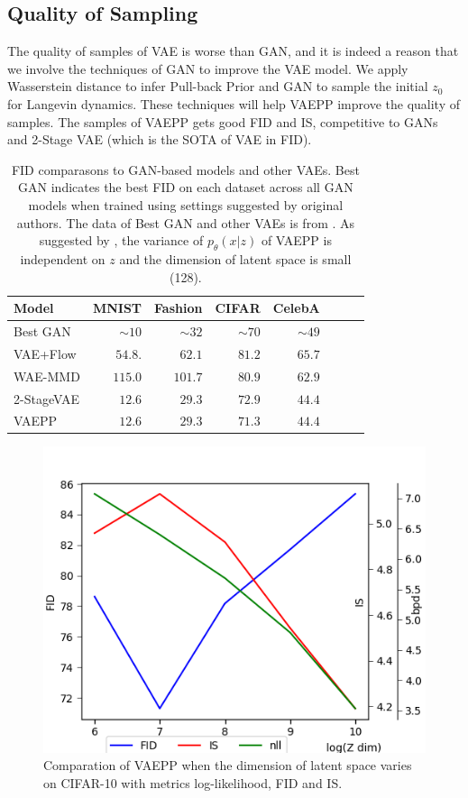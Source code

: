\subsection{Quality of Sampling}
The quality of samples of VAE is worse than GAN, and it is indeed a reason that we involve the techniques of GAN to improve the VAE model. We apply Wasserstein distance to infer Pull-back Prior and GAN to sample the initial $z_0$ for Langevin dynamics. These techniques will help VAEPP improve the quality of samples. The samples of VAEPP gets good FID and IS, competitive to GANs and 2-Stage VAE (which is the SOTA of VAE in FID). 
\begin{table}[tb]
\centering
\begin{tabular}{lrrrrrrr}  
\toprule
Model & MNIST & Fashion & CIFAR & CelebA\\
\midrule
Best GAN   & $\sim10$& $\sim32$&$\sim70$& $\sim49$\\
VAE+Flow   & $54.8$. & $62.1$  & $81.2$ & $65.7$\\
WAE-MMD    & $115.0$ & $101.7$ & $80.9$ & $62.9$\\
2-StageVAE & $12.6$  & $29.3$  & $72.9$ & $44.4$\\
VAEPP      & $12.6$  & $29.3$  & $71.3$ & $44.4$ \\
\bottomrule
\end{tabular}
\caption{FID comparasons to GAN-based models and other VAEs. Best GAN indicates the best FID on each dataset across all GAN models when trained using settings suggested by original authors. The data of Best GAN and other VAEs is from \protect\cite{dai2019diagnosing}. As suggested by \protect\cite{dai2019diagnosing}, the variance of $p_\theta(x|z)$ of VAEPP is independent on $z$ and the dimension of latent space is small (128). }
\label{tab:compare_FID}
\end{table}
\begin{figure}
	\centering
	\includegraphics[width=0.5\columnwidth]{../figures/fid_is_nll_on_different_dim.png}
	\caption{
	Comparation of VAEPP when the dimension of latent space varies on CIFAR-10 with metrics log-likelihood, FID and IS.
	}
	\label{fig:compare_nD_over_z_dim}
\end{figure}

